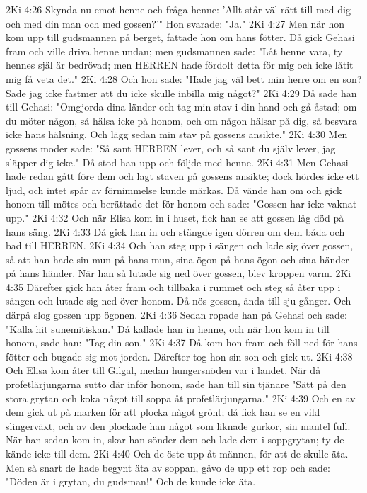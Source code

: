2Ki 4:26  Skynda nu emot henne och fråga henne: 'Allt står väl rätt till med dig och med din man och med gossen?'" Hon svarade: "Ja."
2Ki 4:27  Men när hon kom upp till gudsmannen på berget, fattade hon om hans fötter. Då gick Gehasi fram och ville driva henne undan; men gudsmannen sade: "Låt henne vara, ty hennes själ är bedrövad; men HERREN hade fördolt detta för mig och icke låtit mig få veta det."
2Ki 4:28  Och hon sade: "Hade jag väl bett min herre om en son? Sade jag icke fastmer att du icke skulle inbilla mig något?"
2Ki 4:29  Då sade han till Gehasi: "Omgjorda dina länder och tag min stav i din hand och gå åstad; om du möter någon, så hälsa icke på honom, och om någon hälsar på dig, så besvara icke hans hälsning. Och lägg sedan min stav på gossens ansikte."
2Ki 4:30  Men gossens moder sade: "Så sant HERREN lever, och så sant du själv lever, jag släpper dig icke." Då stod han upp och följde med henne.
2Ki 4:31  Men Gehasi hade redan gått före dem och lagt staven på gossens ansikte; dock hördes icke ett ljud, och intet spår av förnimmelse kunde märkas. Då vände han om och gick honom till mötes och berättade det för honom och sade: "Gossen har icke vaknat upp."
2Ki 4:32  Och när Elisa kom in i huset, fick han se att gossen låg död på hans säng.
2Ki 4:33  Då gick han in och stängde igen dörren om dem båda och bad till HERREN.
2Ki 4:34  Och han steg upp i sängen och lade sig över gossen, så att han hade sin mun på hans mun, sina ögon på hans ögon och sina händer på hans händer. När han så lutade sig ned över gossen, blev kroppen varm.
2Ki 4:35  Därefter gick han åter fram och tillbaka i rummet och steg så åter upp i sängen och lutade sig ned över honom. Då nös gossen, ända till sju gånger. Och därpå slog gossen upp ögonen.
2Ki 4:36  Sedan ropade han på Gehasi och sade: "Kalla hit sunemitiskan." Då kallade han in henne, och när hon kom in till honom, sade han: "Tag din son."
2Ki 4:37  Då kom hon fram och föll ned för hans fötter och bugade sig mot jorden. Därefter tog hon sin son och gick ut.
2Ki 4:38  Och Elisa kom åter till Gilgal, medan hungersnöden var i landet. När då profetlärjungarna sutto där inför honom, sade han till sin tjänare "Sätt på den stora grytan och koka något till soppa åt profetlärjungarna."
2Ki 4:39  Och en av dem gick ut på marken för att plocka något grönt; då fick han se en vild slingerväxt, och av den plockade han något som liknade gurkor, sin mantel full. När han sedan kom in, skar han sönder dem och lade dem i soppgrytan; ty de kände icke till dem.
2Ki 4:40  Och de öste upp åt männen, för att de skulle äta. Men så snart de hade begynt äta av soppan, gåvo de upp ett rop och sade: "Döden är i grytan, du gudsman!" Och de kunde icke äta.
